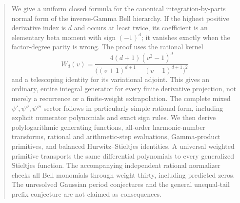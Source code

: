 \documentclass[11pt,letterpaper]{article}
\numberwithin{equation}{section}
\theoremstyle{plain}
\theoremstyle{definition}
\theoremstyle{remark}
\begin{document}
\begin{abstract}
We give a uniform closed formula for the canonical integration-by-parts normal form of the inverse-Gamma Bell hierarchy. If the highest positive derivative index is $d$ and occurs at least twice, its coefficient is an elementary beta moment with sign $(-1)^d$; it vanishes exactly when the factor-degree parity is wrong. The proof uses the rational kernel
\[
 W_d(v)=\frac{4(d+1)(v^2-1)^d}{\bigl((v+1)^{d+1}-(v-1)^{d+1}\bigr)^2}
\]
and a telescoping identity for its variational adjoint. This gives an ordinary, entire integral generator for every finite derivative projection, not merely a recurrence or a finite-weight extrapolation. The complete mixed $\psi',\psi'',\psi'''$ sector follows in particularly simple rational form, including explicit numerator polynomials and exact sign rules. We then derive polylogarithmic generating functions, all-order harmonic-number transforms, rational and arithmetic-step evaluations, Gamma-product primitives, and balanced Hurwitz--Stieltjes identities. A universal weighted primitive transports the same differential polynomials to every generalized Stieltjes function. The accompanying independent rational normalizer checks all Bell monomials through weight thirty, including predicted zeros. The unresolved Gaussian period conjectures and the general unequal-tail prefix conjecture are not claimed as consequences.
\end{abstract}
\tableofcontents
\clearpage
{}











\appendix


\end{document}
